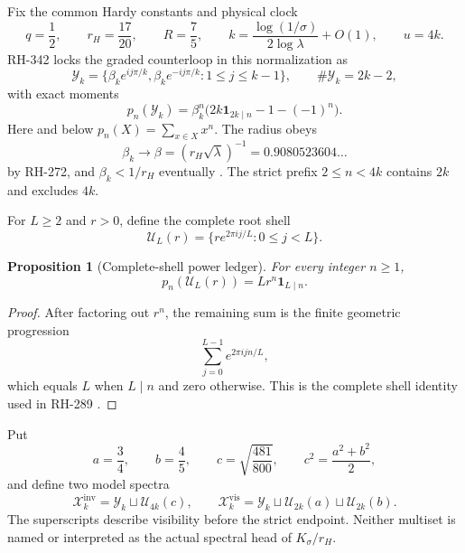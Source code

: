 \documentclass[11pt]{article}
\newtheorem{proposition}[theorem]{Proposition}
\theoremstyle{remark}
\newcommand{\cU}{\mathcal U}
\newcommand{\cY}{\mathcal Y}
\newcommand{\cX}{\mathcal X}
\newcommand{\one}{\mathbf 1}
\newcommand{\inv}{\mathrm{inv}}
\newcommand{\vis}{\mathrm{vis}}
\begin{document}
Fix the common Hardy constants and physical clock
\begin{equation}\label{eq:constants-clock}
 q=\frac12,\qquad r_H=\frac{17}{20},\qquad R=\frac75,
 \qquad
 k=\frac{\log(1/\sigma)}{2\log\lambda}+O(1),
 \qquad u=4k.
\end{equation}
RH-342 locks the graded counterloop in this normalization as
\begin{equation}\label{eq:Y}
 \cY_k=\{\beta_k e^{ij\pi/k},\beta_k e^{-ij\pi/k}:
                    1\le j\le k-1\},
 \qquad \#\cY_k=2k-2,
\end{equation}
with exact moments
\begin{equation}\label{eq:Y-moments}
 p_n(\cY_k)=\beta_k^n
 \bigl(2k\one_{2k\mid n}-1-(-1)^n\bigr).
\end{equation}
Here and below $p_n(X)=\sum_{x\in X}x^n$.  The radius obeys
\begin{equation}\label{eq:beta-limit}
 \beta_k\longrightarrow
 \beta=(r_H\sqrt\lambda)^{-1}=0.9080523604\ldots
\end{equation}
by RH-272, and $\beta_k<1/r_H$ eventually
\citep{WangCounterloop2026,WangRankLock2026}.  The strict prefix
$2\le n<4k$ contains $2k$ and excludes $4k$.

For $L\ge2$ and $r>0$, define the complete root shell
\begin{equation}\label{eq:full-shell}
 \cU_L(r)=\{re^{2\pi ij/L}:0\le j<L\}.
\end{equation}

\begin{proposition}[Complete-shell power ledger]
\label{prop:shell-ledger}
For every integer $n\ge1$,
\begin{equation}\label{eq:shell-ledger}
 p_n(\cU_L(r))=Lr^n\one_{L\mid n}.
\end{equation}
\end{proposition}

\begin{proof}
After factoring out $r^n$, the remaining sum is the finite geometric
progression
\[
 \sum_{j=0}^{L-1}e^{2\pi ijn/L},
\]
which equals $L$ when $L\mid n$ and zero otherwise.  This is the complete
shell identity used in RH-289 \citep{WangShellNonidentifiability2026}.
\end{proof}

Put
\begin{equation}\label{eq:radii}
 a=\frac34,\qquad b=\frac45,\qquad
 c=\sqrt{\frac{481}{800}},
 \qquad c^2=\frac{a^2+b^2}{2},
\end{equation}
and define two model spectra
\begin{equation}\label{eq:candidates}
 \cX_k^{\inv}=\cY_k\sqcup\cU_{4k}(c),
 \qquad
 \cX_k^{\vis}=\cY_k\sqcup\cU_{2k}(a)
                         \sqcup\cU_{2k}(b).
\end{equation}
The superscripts describe visibility before the strict endpoint.  Neither
multiset is named or interpreted as the actual spectral head of
$K_\sigma/r_H$.
\end{document}

